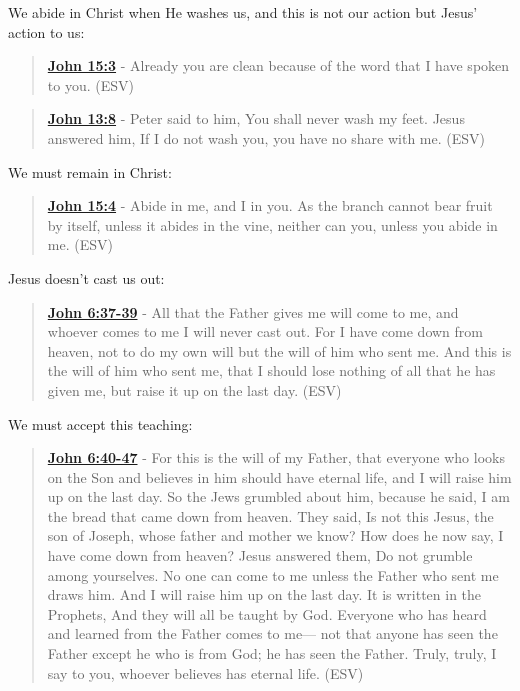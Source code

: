 \documentclass[11pt]{article}
\begin{document}
We abide in Christ when He washes us, and this is not our action but Jesus' action to us:

\begin{quote}
\textbf{\href{https://www.biblegateway.com/passage/?search=John\%2015\%3A3\&version=ESV}{John 15:3}} - Already you are clean because of the word that I have spoken to you. (ESV)
\end{quote}

\begin{quote}
\textbf{\href{https://www.biblegateway.com/passage/?search=John\%2013\%3A8\&version=ESV}{John 13:8}} - Peter said to him, You shall never wash my feet. Jesus answered him, If I do not wash you, you have no share with me. (ESV)
\end{quote}

We must remain in Christ:

\begin{quote}
\textbf{\href{https://www.biblegateway.com/passage/?search=John\%2015\%3A4\&version=ESV}{John 15:4}} - Abide in me, and I in you. As the branch cannot bear fruit by itself, unless it abides in the vine, neither can you, unless you abide in me. (ESV)
\end{quote}

Jesus doesn't cast us out:

\begin{quote}
\textbf{\href{https://www.biblegateway.com/passage/?search=John\%206\%3A37-39\&version=ESV}{John 6:37-39}} - All that the Father gives me will come to me, and whoever comes to me I will never cast out. For I have come down from heaven, not to do my own will but the will of him who sent me. And this is the will of him who sent me, that I should lose nothing of all that he has given me, but raise it up on the last day. (ESV)
\end{quote}

We must accept this teaching:

\begin{quote}
\textbf{\href{https://www.biblegateway.com/passage/?search=John\%206\%3A40-47\&version=ESV}{John 6:40-47}} - For this is the will of my Father, that everyone who looks on the Son and believes in him should have eternal life, and I will raise him up on the last day. So the Jews grumbled about him, because he said, I am the bread that came down from heaven. They said, Is not this Jesus, the son of Joseph, whose father and mother we know? How does he now say, I have come down from heaven? Jesus answered them, Do not grumble among yourselves. No one can come to me unless the Father who sent me draws him. And I will raise him up on the last day. It is written in the Prophets, And they will all be taught by God. Everyone who has heard and learned from the Father comes to me— not that anyone has seen the Father except he who is from God; he has seen the Father. Truly, truly, I say to you, whoever believes has eternal life. (ESV)
\end{quote}
\end{document}
